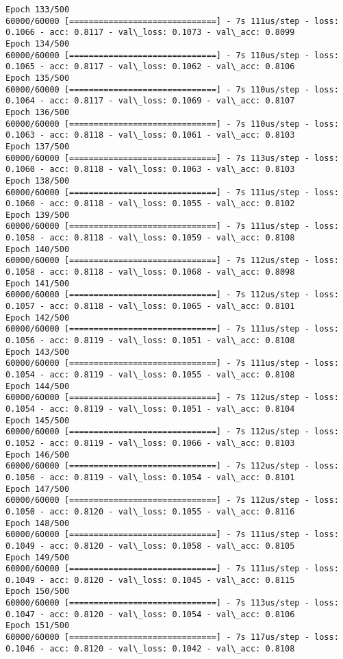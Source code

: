 \documentclass[11pt]{article}
\begin{document}
\begin{Verbatim}[commandchars=\\\{\}]
Epoch 133/500
60000/60000 [==============================] - 7s 111us/step - loss: 0.1066 - acc: 0.8117 - val\_loss: 0.1073 - val\_acc: 0.8099
Epoch 134/500
60000/60000 [==============================] - 7s 110us/step - loss: 0.1065 - acc: 0.8117 - val\_loss: 0.1062 - val\_acc: 0.8106
Epoch 135/500
60000/60000 [==============================] - 7s 110us/step - loss: 0.1064 - acc: 0.8117 - val\_loss: 0.1069 - val\_acc: 0.8107
Epoch 136/500
60000/60000 [==============================] - 7s 110us/step - loss: 0.1063 - acc: 0.8118 - val\_loss: 0.1061 - val\_acc: 0.8103
Epoch 137/500
60000/60000 [==============================] - 7s 113us/step - loss: 0.1060 - acc: 0.8118 - val\_loss: 0.1063 - val\_acc: 0.8103
Epoch 138/500
60000/60000 [==============================] - 7s 111us/step - loss: 0.1060 - acc: 0.8118 - val\_loss: 0.1055 - val\_acc: 0.8102
Epoch 139/500
60000/60000 [==============================] - 7s 111us/step - loss: 0.1058 - acc: 0.8118 - val\_loss: 0.1059 - val\_acc: 0.8108
Epoch 140/500
60000/60000 [==============================] - 7s 112us/step - loss: 0.1058 - acc: 0.8118 - val\_loss: 0.1068 - val\_acc: 0.8098
Epoch 141/500
60000/60000 [==============================] - 7s 112us/step - loss: 0.1057 - acc: 0.8118 - val\_loss: 0.1065 - val\_acc: 0.8101
Epoch 142/500
60000/60000 [==============================] - 7s 111us/step - loss: 0.1056 - acc: 0.8119 - val\_loss: 0.1051 - val\_acc: 0.8108
Epoch 143/500
60000/60000 [==============================] - 7s 111us/step - loss: 0.1054 - acc: 0.8119 - val\_loss: 0.1055 - val\_acc: 0.8108
Epoch 144/500
60000/60000 [==============================] - 7s 112us/step - loss: 0.1054 - acc: 0.8119 - val\_loss: 0.1051 - val\_acc: 0.8104
Epoch 145/500
60000/60000 [==============================] - 7s 112us/step - loss: 0.1052 - acc: 0.8119 - val\_loss: 0.1066 - val\_acc: 0.8103
Epoch 146/500
60000/60000 [==============================] - 7s 112us/step - loss: 0.1050 - acc: 0.8119 - val\_loss: 0.1054 - val\_acc: 0.8101
Epoch 147/500
60000/60000 [==============================] - 7s 112us/step - loss: 0.1050 - acc: 0.8120 - val\_loss: 0.1055 - val\_acc: 0.8116
Epoch 148/500
60000/60000 [==============================] - 7s 111us/step - loss: 0.1049 - acc: 0.8120 - val\_loss: 0.1058 - val\_acc: 0.8105
Epoch 149/500
60000/60000 [==============================] - 7s 111us/step - loss: 0.1049 - acc: 0.8120 - val\_loss: 0.1045 - val\_acc: 0.8115
Epoch 150/500
60000/60000 [==============================] - 7s 113us/step - loss: 0.1047 - acc: 0.8120 - val\_loss: 0.1054 - val\_acc: 0.8106
Epoch 151/500
60000/60000 [==============================] - 7s 117us/step - loss: 0.1046 - acc: 0.8120 - val\_loss: 0.1042 - val\_acc: 0.8108

\end{Verbatim}
\end{document}

